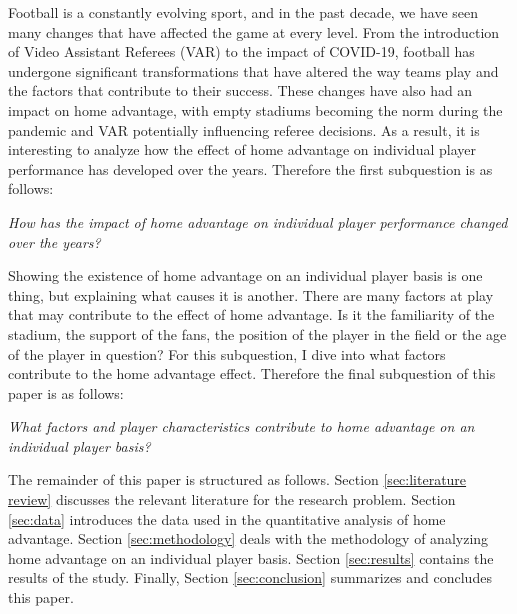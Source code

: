 \noindent
Football is a constantly evolving sport, and in the past decade, we have seen many changes that have affected the game at every level. From the introduction of Video Assistant Referees (VAR) to the impact of COVID-19, football has undergone significant transformations that have altered the way teams play and the factors that contribute to their success. These changes have also had an impact on home advantage, with empty stadiums becoming the norm during the pandemic and VAR potentially influencing referee decisions. As a result, it is interesting to analyze how the effect of home advantage on individual player performance has developed over the years. Therefore the first subquestion is as follows:
\begin{center}
    \textit{How has the impact of home advantage on individual player performance changed over the years?}
\end{center}

\noindent
Showing the existence of home advantage on an individual player basis is one thing, but explaining what causes it is another. There are many factors at play that may contribute to the effect of home advantage. Is it the familiarity of the stadium, the support of the fans, the position of the player in the field or the age of the player in question? For this subquestion, I dive into what factors contribute to the home advantage effect. Therefore the final subquestion of this paper is as follows:
\begin{center}
    \textit{What factors and player characteristics contribute to home advantage on an individual player basis?}
\end{center}

\noindent
The remainder of this paper is structured as follows. Section \ref{sec:literature review} discusses the relevant literature for the research problem. Section \ref{sec:data} introduces the data used in the quantitative analysis of home advantage. Section \ref{sec:methodology} deals with the methodology of analyzing home advantage on an individual player basis. Section \ref{sec:results} contains the results of the study. Finally, Section \ref{sec:conclusion} summarizes and concludes this paper.